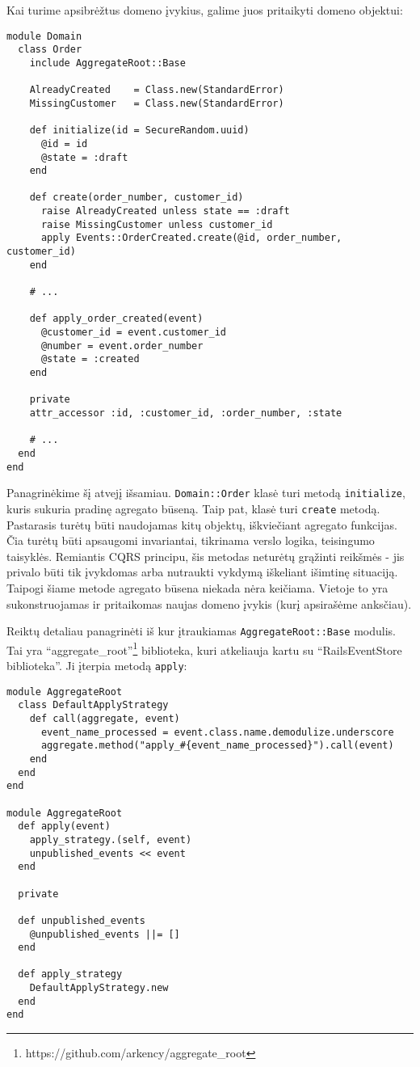Kai turime apsibrėžtus domeno įvykius, galime juos pritaikyti domeno objektui:

\begin{lstlisting}
module Domain
  class Order
    include AggregateRoot::Base

    AlreadyCreated    = Class.new(StandardError)
    MissingCustomer   = Class.new(StandardError)

    def initialize(id = SecureRandom.uuid)
      @id = id
      @state = :draft
    end

    def create(order_number, customer_id)
      raise AlreadyCreated unless state == :draft
      raise MissingCustomer unless customer_id
      apply Events::OrderCreated.create(@id, order_number, customer_id)
    end

    # ...

    def apply_order_created(event)
      @customer_id = event.customer_id
      @number = event.order_number
      @state = :created
    end

    private
    attr_accessor :id, :customer_id, :order_number, :state

    # ...
  end
end
\end{lstlisting}

Panagrinėkime šį atvejį išsamiau. \lstinline|Domain::Order| klasė turi metodą \lstinline|initialize|, kuris sukuria pradinę agregato būseną. Taip pat, klasė turi \lstinline|create| metodą. Pastarasis turėtų būti naudojamas kitų objektų, iškviečiant agregato funkcijas. Čia turėtų būti apsaugomi invariantai, tikrinama verslo logika, teisingumo taisyklės. Remiantis CQRS principu, šis metodas neturėtų grąžinti reikšmės - jis privalo būti tik įvykdomas arba nutraukti vykdymą iškeliant išimtinę situaciją. Taipogi šiame metode agregato būsena niekada nėra keičiama. Vietoje to yra sukonstruojamas ir pritaikomas naujas domeno įvykis (kurį apsirašėme anksčiau).

Reiktų detaliau panagrinėti iš kur įtraukiamas \lstinline|AggregateRoot::Base| modulis. Tai yra ``aggregate\_root''\footnote{https://github.com/arkency/aggregate\_root} biblioteka, kuri atkeliauja kartu su ``RailsEventStore biblioteka''. Ji įterpia metodą \lstinline|apply|:

\begin{lstlisting}
module AggregateRoot
  class DefaultApplyStrategy
    def call(aggregate, event)
      event_name_processed = event.class.name.demodulize.underscore
      aggregate.method("apply_#{event_name_processed}").call(event)
    end
  end
end

module AggregateRoot
  def apply(event)
    apply_strategy.(self, event)
    unpublished_events << event
  end

  private

  def unpublished_events
    @unpublished_events ||= []
  end

  def apply_strategy
    DefaultApplyStrategy.new
  end
end
\end{lstlisting}

